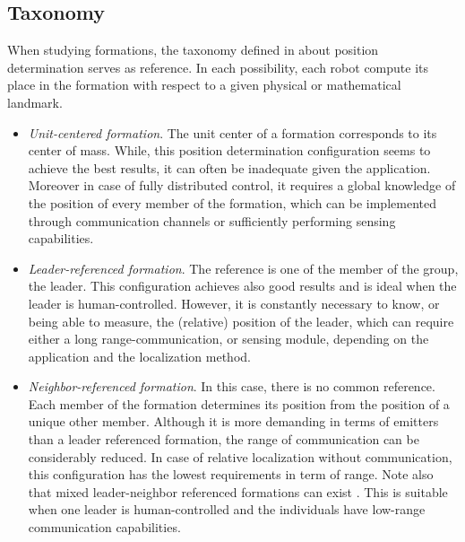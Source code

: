 \documentclass[a4paper, 12pt]{report}
\begin{document}
\subsection{Taxonomy}
When studying formations, the taxonomy defined in \cite{Arkin1999} about position determination serves as reference. In each possibility, each robot compute its place in the formation with respect to a given physical or mathematical landmark.
\begin{itemize}
\item \emph{Unit-centered formation}. The unit center of a formation corresponds to its center of mass. While, this position determination configuration seems to achieve the best results, it can often be inadequate given the application. Moreover in case of fully distributed control, it requires a global knowledge of the position of every member of the formation, which can be implemented through communication channels or sufficiently performing sensing capabilities.
\item \emph{Leader-referenced formation}. The reference is one of the member of the group, the leader. This configuration achieves also good results and is ideal when the leader is human-controlled. However, it is constantly necessary to know, or being able to measure, the (relative) position of the leader, which can require either a long range-communication, or sensing module, depending on the application and the localization method.
\item \emph{Neighbor-referenced formation}. In this case, there is no common reference. Each member of the formation determines its position from the position of a unique other member. Although it is more demanding in terms of emitters than a leader referenced formation, the range of communication can be considerably reduced. In case of relative localization without communication, this configuration has the lowest requirements in term of range. Note also that mixed leader-neighbor referenced formations can exist \cite{Mataric2002}. This is suitable when one leader is human-controlled and the individuals have low-range communication capabilities.
\end{itemize}
\end{document}
